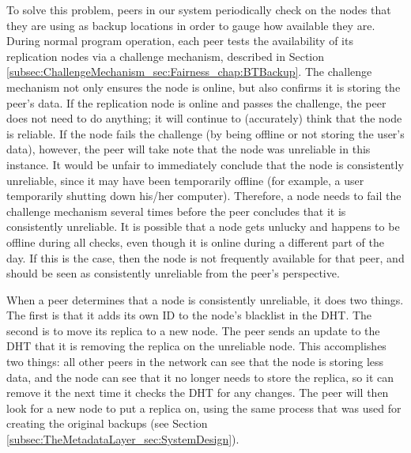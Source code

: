 \documentclass[12pt]{report}
\begin{document}
To solve this problem, peers in our system periodically check on the nodes that they are using as backup locations in order to gauge how available they are. During normal program operation, each peer tests the availability of its replication nodes via a challenge mechanism, described in Section \ref{subsec:ChallengeMechanism_sec:Fairness_chap:BTBackup}. The challenge mechanism not only ensures the node is online, but also confirms it is storing the peer's data. If the replication node is online and passes the challenge, the peer does not need to do anything; it will continue to (accurately) think that the node is reliable. If the node fails the challenge (by being offline or not storing the user's data), however, the peer will take note that the node was unreliable in this instance. It would be unfair to immediately conclude that the node is consistently unreliable, since it may have been temporarily offline (for example, a user temporarily shutting down his/her computer). Therefore, a node needs to fail the challenge mechanism several times before the peer concludes that it is consistently unreliable. It is possible that a node gets unlucky and happens to be offline during all checks, even though it is online during a different part of the day. If this is the case, then the node is not frequently available for that peer, and should be seen as consistently unreliable from the peer's perspective.

When a peer determines that a node is consistently unreliable, it does two things. The first is that it adds its own ID to the node's blacklist in the DHT. The second is to move its replica to a new node. The peer sends an update to the DHT that it is removing the replica on the unreliable node. This accomplishes two things: all other peers in the network can see that the node is storing less data, and the node can see that it no longer needs to store the replica, so it can remove it the next time it checks the DHT for any changes. The peer will then look for a new node to put a replica on, using the same process that was used for creating the original backups (see Section \ref{subsec:TheMetadataLayer_sec:SystemDesign}). %
\end{document}
